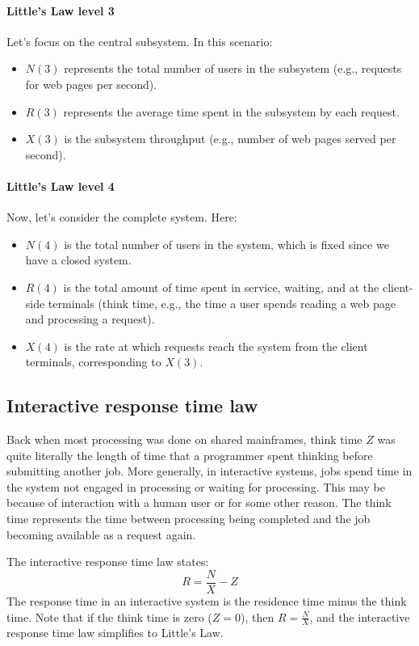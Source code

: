 \paragraph*{Little's Law level 3}
Let's focus on the central subsystem.
In this scenario:
\begin{itemize}
    \item $N(3)$ represents the total number of users in the subsystem (e.g., requests for web pages per second).
    \item $R(3)$ represents the average time spent in the subsystem by each request.
    \item $X(3)$ is the subsystem throughput (e.g., number of web pages served per second).
\end{itemize}

\paragraph*{Little's Law level 4}
Now, let's consider the complete system.
Here:
\begin{itemize}
    \item $N(4)$ is the total number of users in the system, which is fixed since we have a closed system.
    \item $R(4)$ is the total amount of time spent in service, waiting, and at the client-side terminals (think time, e.g., the time a user spends reading a web page and processing a request).
    \item $X(4)$ is the rate at which requests reach the system from the client terminals, corresponding to $X(3)$. 
\end{itemize}

\subsection{Interactive response time law}
Back when most processing was done on shared mainframes, think time $Z$ was quite literally the length of time that a programmer spent thinking before submitting another job.
More generally, in interactive systems, jobs spend time in the system not engaged in processing or waiting for processing. 
This may be because of interaction with a human user or for some other reason. 
The think time represents the time between processing being completed and the job becoming available as a request again.

The interactive response time law states:
\[R =\dfrac{N}{X}-Z\]
The response time in an interactive system is the residence time minus the think time.
Note that if the think time is zero ($Z=0$), then $R =\frac{N}{X}$, and the interactive response time law simplifies to Little's Law.

